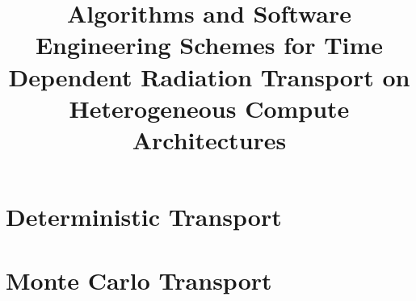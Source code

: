 \documentclass[11pt,onehalf]{beavtex}
\title{Algorithms and Software Engineering Schemes for Time Dependent Radiation Transport on Heterogeneous Compute Architectures}
\author{\TheAuthors{}}
\newcommand{\TheAuthors}{Joanna Piper Morgan}
\begin{document}
\maketitle

\mainmatter



\newcommand{\TheTitle}{BLANK}
\renewcommand{\TheAuthors}{BLANK}
\newcommand{\TheAddress}{BLANK}






\part{Deterministic Transport}
\label{part:determ}






\part{Monte Carlo Transport}
\label{part:mc}










\newpage



\printbibliography[]


\appendix


\newpage

\newpage

\newpage

\end{document}
